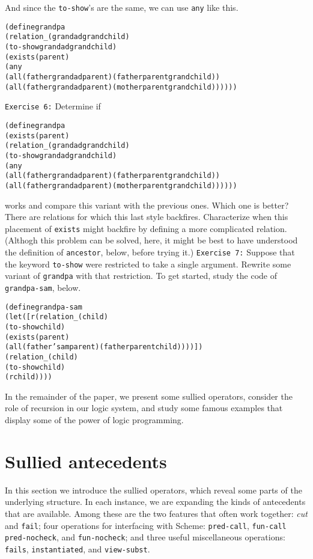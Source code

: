 And since the \texttt{to-show}'s are the same, we can use \texttt{any}
like this.

\begin{alltt}
(define grandpa
  (relation _ (grandad grandchild)
    (to-show grandad grandchild)
    (exists (parent)
      (any
        (all (father grandad parent) (father parent grandchild))
        (all (father grandad parent) (mother parent grandchild))))))
\end{alltt}

\texttt{Exercise 6:}
Determine if 
\begin{alltt}
(define grandpa
  (exists (parent)
    (relation _ (grandad grandchild)
    (to-show grandad grandchild)
      (any
        (all (father grandad parent) (father parent grandchild))
        (all (father grandad parent) (mother parent grandchild))))))
\end{alltt}
works and compare this variant with the previous ones.  Which one is
better?  There are relations for which this last style backfires.
Characterize when this placement of \texttt{exists} might backfire
by defining a more complicated relation.  (Althogh this problem can
be solved, here, it might be best to have understood the definition
of \texttt{ancestor}, below, before trying it.)
\newpage
\texttt{Exercise 7:} Suppose that the keyword \texttt{to-show} were
restricted to take a single argument.  Rewrite some variant of
\texttt{grandpa} with that restriction.  To get started, study the code
of \texttt{grandpa-sam}, below.

\begin{alltt}
(define grandpa-sam
  (let ([r (relation _ (child)
             (to-show child)
             (exists (parent)
               (all (father 'sam parent) (father parent child))))])
    (relation _ (child)
      (to-show child)
      (r child))))
\end{alltt}

In the remainder of the paper, we present some sullied operators,
consider the role of recursion in our logic system, and study some
famous examples that display some of the power of logic programming.

\section{Sullied antecedents}

In this section we introduce the sullied operators, which reveal some
parts of the underlying structure.  In each instance, we are expanding
the kinds of antecedents that are available.  Among these are the two
features that often work together: \emph{cut} and \texttt{fail}; four
operations for interfacing with Scheme: \texttt{pred-call},
\texttt{fun-call} \texttt{pred-nocheck}, and \texttt{fun-nocheck}; and
three useful miscellaneous operations: \texttt{fails},
\texttt{instantiated}, and \texttt{view-subst}.


